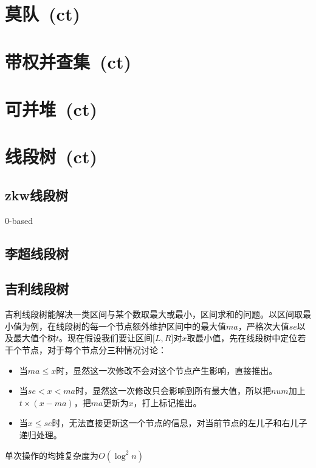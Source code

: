 \section{莫队\ \small(ct)}
\section{带权并查集\ \small(ct)}
\section{可并堆\ \small(ct)}
\section{线段树\ \small(ct)}
	\subsection*{zkw线段树}
		$ 0 $-based
	\subsection*{李超线段树}
	\subsection*{吉利线段树}
		吉利线段树能解决一类区间与某个数取最大或最小，区间求和的问题。以区间取最小值为例，在线段树的每一个节点额外维护区间中的最大值$ ma $，严格次大值$ se $以及最大值个树$ t $。现在假设我们要让区间$ \lbrack L, R \rbrack $对$ x $取最小值，先在线段树中定位若干个节点，对于每个节点分三种情况讨论：
		\begin{itemize}[nosep,wide=0pt]
			\item 当$ ma \leq x $时，显然这一次修改不会对这个节点产生影响，直接推出。
			\item 当$ se < x < ma $时，显然这一次修改只会影响到所有最大值，所以把$ num $加上$ t \times (x - ma) $，把$ ma $更新为$ x $，打上标记推出。
			\item 当$ x \leq se $时，无法直接更新这一个节点的信息，对当前节点的左儿子和右儿子递归处理。
		\end{itemize}
		单次操作的均摊复杂度为$ O(\log^2 n) $

